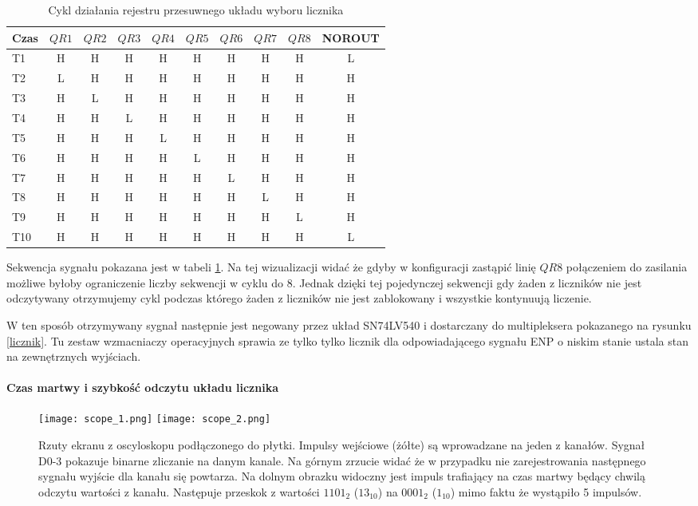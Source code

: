 \begin{table}
        \centering
        \caption{Cykl działania rejestru przesuwnego układu wyboru licznika}
        \label{shift sygnal}
        \begin{tabular}{lccccccccc}
                Czas &$QR1$&$QR2$&$QR3$&$QR4$&$QR5$&$QR6$&$QR7$&$QR8$  &NOROUT\\ \hline     
                T1&H&H&H&H&H&H&H&H &L\\
                T2&L&H&H&H&H&H&H&H &H\\
                T3&H&L&H&H&H&H&H&H &H\\
                T4&H&H&L&H&H&H&H&H &H\\
                T5&H&H&H&L&H&H&H&H &H\\
                T6&H&H&H&H&L&H&H&H &H\\
                T7&H&H&H&H&H&L&H&H &H\\
                T8&H&H&H&H&H&H&L&H &H\\
                T9&H&H&H&H&H&H&H&L &H\\
                T10&H&H&H&H&H&H&H&H &L\\
        \end{tabular}
\end{table}

Sekwencja sygnału pokazana jest w tabeli \ref{shift sygnal}. Na tej wizualizacji widać że gdyby w konfiguracji zastąpić linię $QR8$ połączeniem do zasilania możliwe byłoby ograniczenie liczby sekwencji w cyklu do 8. Jednak dzięki tej pojedynczej sekwencji gdy żaden z liczników nie jest odczytywany otrzymujemy cykl podczas którego żaden z liczników nie jest zablokowany i wszystkie kontynuują liczenie. 

W ten sposób otrzymywany sygnał następnie jest negowany przez układ SN74LV540 i dostarczany do multipleksera pokazanego na rysunku \ref{licznik}.
Tu zestaw wzmacniaczy operacyjnych sprawia ze tylko tylko licznik dla odpowiadającego sygnału ENP o niskim stanie ustala stan na zewnętrznych wyjściach. 

\paragraph{Czas martwy i szybkość odczytu układu licznika}

\begin{figure}
        \texttt{[image: scope\_1.png]}
        \texttt{[image: scope\_2.png]}
        \caption{Rzuty ekranu z oscyloskopu podłączonego do płytki. 
        Impulsy wejściowe (żółte) są wprowadzane na jeden z kanałów. 
        Sygnał D0-3 pokazuje binarne zliczanie na danym kanale. 
        Na górnym zrzucie widać że w przypadku nie zarejestrowania następnego sygnału wyjście dla kanału się powtarza. 
        Na dolnym obrazku widoczny jest impuls trafiający na czas martwy będący chwilą odczytu wartości z kanału.
        Następuje przeskok z wartości $1101_{2}$ ($13_{10}$) na $0001_{2}$ ($1_{10}$) mimo faktu że wystąpiło 5 impulsów.
        }
        \label{Oscyloskop}
\end{figure}

